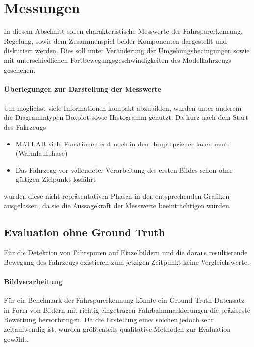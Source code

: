 \section{Messungen}
In diesem Abschnitt sollen charakteristische Messwerte der Fahrspurerkennung, Regelung, sowie dem Zusammenspiel beider Komponenten dargestellt und diskutiert werden. Dies soll unter Veränderung der Umgebungsbedingungen sowie mit unterschiedlichen Fortbewegungsgeschwindigkeiten des Modellfahrzeugs geschehen.

\paragraph{Überlegungen zur Darstellung der Messwerte}
Um möglichst viele Informationen kompakt abzubilden, wurden unter anderem die Diagrammtypen Boxplot sowie Histogramm genutzt. Da kurz nach dem Start des Fahrzeugs 
\begin{itemize}
	\item
	MATLAB viele Funktionen erst noch in den Hauptspeicher laden muss (\glqq Warmlaufphase\grqq)
	\item
	Das Fahrzeug vor vollendeter Verarbeitung des ersten Bildes schon ohne gültigen Zielpunkt losfährt
\end{itemize}
wurden diese nicht-repräsentativen Phasen in den entsprechenden Grafiken ausgelassen, da sie die Aussagekraft der Messwerte beeinträchtigen würden.
  
\subsection{Evaluation ohne Ground Truth}
Für die Detektion von Fahrspuren auf Einzelbildern und die daraus resultierende Bewegung des Fahrzeugs existieren zum jetzigen Zeitpunkt keine Vergleichswerte. 

\paragraph{Bildverarbeitung} 
Für ein Benchmark der Fahrspurerkennung könnte ein Ground-Truth-Datensatz in Form von Bildern mit richtig eingetragen Fahrbahnmarkierungen die präziseste Bewertung hervorbringen. Da die Erstellung eines solchen jedoch sehr zeitaufwendig ist, wurden größtenteils qualitative Methoden zur Evaluation gewählt.



